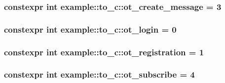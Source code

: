 \subsubsection[{ot\+\_\+create\+\_\+message}]{\setlength{\rightskip}{0pt plus 5cm}constexpr int example\+::to\+\_\+c\+::ot\+\_\+create\+\_\+message = 3}\label{namespaceexample_1_1to__c_a2b9a654e3547c13f770851600e4231d0}
\hypertarget{namespaceexample_1_1to__c_a1c413c74bbeeb1dac71eb03f6fff15f4}{}
\subsubsection[{ot\+\_\+login}]{\setlength{\rightskip}{0pt plus 5cm}constexpr int example\+::to\+\_\+c\+::ot\+\_\+login = 0}\label{namespaceexample_1_1to__c_a1c413c74bbeeb1dac71eb03f6fff15f4}
\hypertarget{namespaceexample_1_1to__c_a25c07b1a24b3a551b7345e568f301dcd}{}
\subsubsection[{ot\+\_\+registration}]{\setlength{\rightskip}{0pt plus 5cm}constexpr int example\+::to\+\_\+c\+::ot\+\_\+registration = 1}\label{namespaceexample_1_1to__c_a25c07b1a24b3a551b7345e568f301dcd}
\hypertarget{namespaceexample_1_1to__c_ae7d3f340353b066ddc0703fc2c2ca5c7}{}
\subsubsection[{ot\+\_\+subscribe}]{\setlength{\rightskip}{0pt plus 5cm}constexpr int example\+::to\+\_\+c\+::ot\+\_\+subscribe = 4}\label{namespaceexample_1_1to__c_ae7d3f340353b066ddc0703fc2c2ca5c7}

